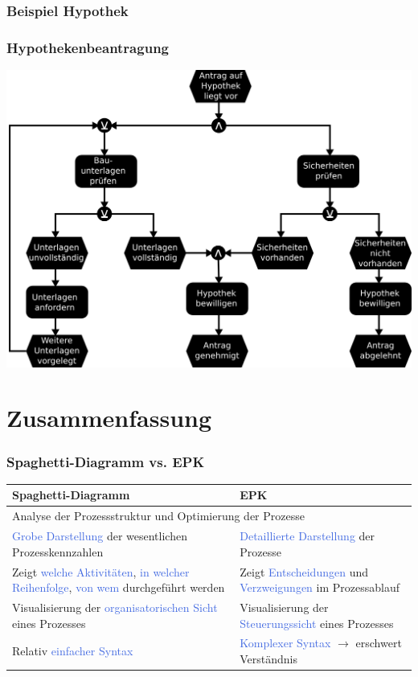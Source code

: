 \documentclass[xcolor=dvipsnames]{beamer}
\begin{document}
 \subsubsection{Beispiel Hypothek}
  \begin{frame}
  \frametitle{Hypothekenbeantragung}
    \centerline{\includegraphics[scale=2.5]{4_11.png}}
 \end{frame}

\section[Zusammenfassung]{Zusammenfassung}
 \begin{frame}
  \frametitle{Spaghetti-Diagramm vs. EPK}
\small{
\begin{tabularx}{\textwidth}{XX}

\hline
\hline
\textbf{Spaghetti-Diagramm} & \textbf{EPK} \\
\hline
\multicolumn{2}{l}{\pause Analyse der Prozessstruktur und Optimierung der Prozesse} \\ \hline
\pause\textcolor{RoyalBlue}{Grobe Darstellung} der wesentlichen Prozesskennzahlen & \pause\textcolor{RoyalBlue}{Detaillierte Darstellung} der Prozesse   \\
\hline
\pause Zeigt \textcolor{RoyalBlue}{welche Aktivitäten}, \textcolor{RoyalBlue}{in welcher Reihenfolge}, \textcolor{RoyalBlue}{von wem} durchgeführt werden & \pause Zeigt \textcolor{RoyalBlue}{Entscheidungen}  und \textcolor{RoyalBlue}{Verzweigungen} im Prozessablauf \\
\hline
\pause Visualisierung der \textcolor{RoyalBlue}{organisatorischen Sicht} eines Prozesses & \pause Visualisierung der \textcolor{RoyalBlue}{Steuerungssicht} eines Prozesses \\
\hline
\pause Relativ \textcolor{RoyalBlue}{einfacher Syntax} & \pause \textcolor{RoyalBlue}{Komplexer Syntax} $\rightarrow$ erschwert Verständnis \\
\hline
\hline


\end{tabularx}
}

  \end{frame}
\end{document}
